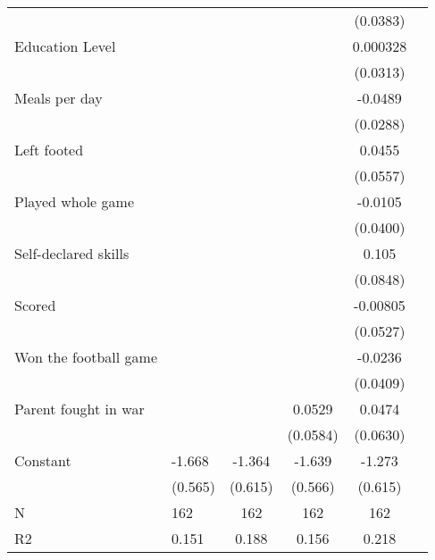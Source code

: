 {\begin{tabularx}{\textwidth}{Xl*{4}{c}}
                    &                     &                     &                     &    (0.0383)         \\
[0.5em]
Education Level     &                     &                     &                     &    0.000328         \\
                    &                     &                     &                     &    (0.0313)         \\
[0.5em]
Meals per day       &                     &                     &                     &     -0.0489\sym{*}  \\
                    &                     &                     &                     &    (0.0288)         \\
[0.5em]
Left footed         &                     &                     &                     &      0.0455         \\
                    &                     &                     &                     &    (0.0557)         \\
[0.5em]
Played whole game   &                     &                     &                     &     -0.0105         \\
                    &                     &                     &                     &    (0.0400)         \\
[0.5em]
Self-declared skills&                     &                     &                     &       0.105         \\
                    &                     &                     &                     &    (0.0848)         \\
[0.5em]
Scored              &                     &                     &                     &    -0.00805         \\
                    &                     &                     &                     &    (0.0527)         \\
[0.5em]
Won the football game&                     &                     &                     &     -0.0236         \\
                    &                     &                     &                     &    (0.0409)         \\
[0.5em]
Parent fought in war&                     &                     &      0.0529         &      0.0474         \\
                    &                     &                     &    (0.0584)         &    (0.0630)         \\
[0.5em]
Constant            &      -1.668\sym{***}&      -1.364\sym{**} &      -1.639\sym{***}&      -1.273\sym{**} \\
                    &     (0.565)         &     (0.615)         &     (0.566)         &     (0.615)         \\

\hline
N                   &         162         &         162         &         162         &         162         \\
R2                  &       0.151         &       0.188         &       0.156         &       0.218         \\
\hline\hline
\end{tabularx}
}
